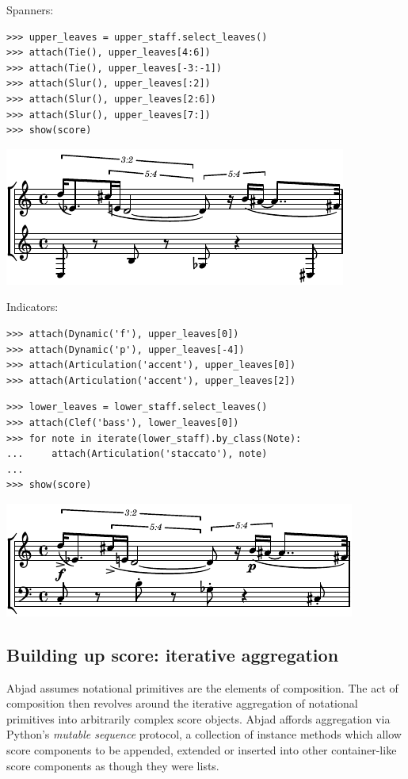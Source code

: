 Spanners:

\begin{lstlisting}
>>> upper_leaves = upper_staff.select_leaves()
>>> attach(Tie(), upper_leaves[4:6])
>>> attach(Tie(), upper_leaves[-3:-1])
>>> attach(Slur(), upper_leaves[:2])
>>> attach(Slur(), upper_leaves[2:6])
>>> attach(Slur(), upper_leaves[7:])
>>> show(score)
\end{lstlisting}

\includegraphics[scale=1.0]{images/notational_isomorphism-2.pdf}


Indicators:

\begin{lstlisting}
>>> attach(Dynamic('f'), upper_leaves[0])
>>> attach(Dynamic('p'), upper_leaves[-4])
>>> attach(Articulation('accent'), upper_leaves[0])
>>> attach(Articulation('accent'), upper_leaves[2])
\end{lstlisting}


\begin{lstlisting}
>>> lower_leaves = lower_staff.select_leaves()
>>> attach(Clef('bass'), lower_leaves[0])
>>> for note in iterate(lower_staff).by_class(Note):
...     attach(Articulation('staccato'), note)
... 
>>> show(score)
\end{lstlisting}

\includegraphics[scale=1.0]{images/notational_isomorphism-3.pdf}


\subsection{Building up score: iterative aggregation}

Abjad assumes notational primitives are the elements of composition. The act of
composition then revolves around the iterative aggregation of notational
primitives into arbitrarily complex score objects. Abjad affords aggregation
via Python's \emph{mutable sequence} protocol, a collection of instance methods
which allow score components to be appended, extended or inserted into other
container-like score components as though they were lists.


